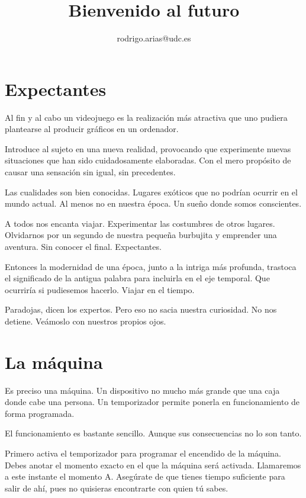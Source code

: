\documentclass[11pt,a4paper]{article}
\title{\textbf{Bienvenido al futuro}}
\author{rodrigo.arias@udc.es}
\date{}
\begin{document}
\maketitle

\section{Expectantes}

Al fin y al cabo un videojuego es la realización más atractiva que uno pudiera 
plantearse al producir gráficos en un ordenador.

Introduce al sujeto en una nueva realidad, provocando que experimente nuevas 
situaciones que han sido cuidadosamente elaboradas. Con el mero propósito de 
causar una sensación sin igual, sin precedentes.

Las cualidades son bien conocidas. Lugares exóticos que no podrían ocurrir en el 
mundo actual. Al menos no en nuestra época. Un sueño donde somos conscientes.  

A todos nos encanta viajar. Experimentar las costumbres de otros lugares.  
Olvidarnos por un segundo de nuestra pequeña burbujita y emprender una aventura.  
Sin conocer el final. Expectantes.

Entonces la modernidad de una época, junto a la intriga más profunda, trastoca 
el significado de la antigua palabra para incluirla en el eje temporal. Que 
ocurriría si pudiesemos hacerlo. Viajar en el tiempo.

Paradojas, dicen los expertos. Pero eso no sacia nuestra curiosidad. No nos 
detiene. Veámoslo con nuestros propios ojos.

\section{La máquina}

Es preciso una máquina. Un dispositivo no mucho más grande que una caja donde 
cabe una persona. Un temporizador permite ponerla en funcionamiento de forma programada.

El funcionamiento es bastante sencillo. Aunque sus consecuencias no lo son 
tanto.

Primero activa el temporizador para programar el encendido de la máquina.  
Debes anotar el momento exacto en el que la máquina será activada. Llamaremos a 
este instante el momento A. Asegúrate de que tienes tiempo suficiente para salir 
de ahí, pues no quisieras encontrarte con quien tú sabes.
\end{document}

